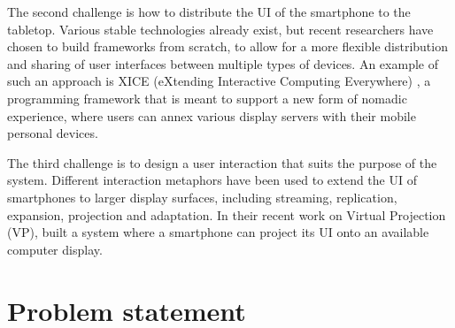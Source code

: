 The second challenge is how to distribute the UI of the smartphone to the tabletop.
Various stable technologies already exist, but recent researchers have chosen to build frameworks from scratch, to allow for a more flexible distribution and sharing of user interfaces between multiple types of devices.
An example of such an approach is XICE (eXtending Interactive Computing Everywhere) \citep{Arthur:2011:xice}, a programming framework that is meant to support a new form of nomadic experience, where users can annex various display servers with their mobile personal devices.

The third challenge is to design a user interaction that suits the purpose of the system.
Different interaction metaphors have been used to extend the UI of smartphones to larger display surfaces, including streaming, replication, expansion, projection and adaptation.
In their recent work on Virtual Projection (VP), \cite{Baur:2012:virtualprojection} built a system where a smartphone can project its UI onto an available computer display.

%
%
%
%
%
%
%
%
%
%

\section{Problem statement}


